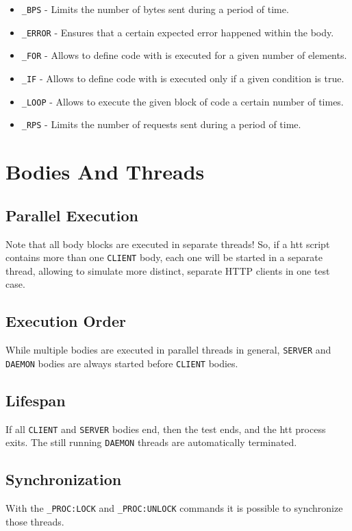 \begin{itemize}
\item \texttt{\_BPS} - Limits the number of bytes sent during a period of time.
\item \texttt{\_ERROR} - Ensures that a certain expected error happened within the body.
\item \texttt{\_FOR} - Allows to define code with is executed for a given number of elements.
\item \texttt{\_IF} - Allows to define code with is executed only if a given condition is true.
\item \texttt{\_LOOP} - Allows to execute the given block of code a certain number of times.
\item \texttt{\_RPS} - Limits the number of requests sent during a period of time.
\end{itemize}


\newpage 
\section{Bodies And Threads}

\subsection{Parallel Execution}
Note that all body blocks are executed in separate threads! So, if a htt 
script contains more than one \texttt{CLIENT} body, each one will be started in a 
separate thread, allowing to simulate more distinct, separate HTTP clients in 
one test case.

\subsection{Execution Order}
While multiple bodies are executed in parallel threads in general, \texttt{SERVER}
and \texttt{DAEMON} bodies are always started before \texttt{CLIENT} bodies.

\subsection{Lifespan}
If all \texttt{CLIENT} and \texttt{SERVER} bodies end, then
the test ends, and the htt process exits. The still running \texttt{DAEMON} threads are
automatically terminated.

\subsection{Synchronization}
With the \texttt{\_PROC:LOCK} and \texttt{\_PROC:UNLOCK} commands it is possible to
synchronize those threads. 


